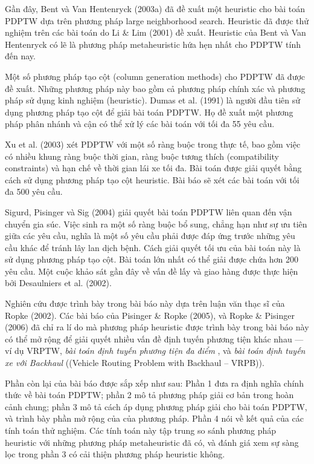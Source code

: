 Gần đây, Bent và Van Hentenryck (2003a) đã đề xuất một heuristic cho bài toán PDPTW dựa trên phương pháp large neighborhood search. Heuristic đã được thử nghiệm trên các bài toán do Li \& Lim (2001) đề xuất. Heuristic của Bent và Van Hentenryck có lẽ là phương pháp metaheuristic hứa hẹn nhất cho PDPTW tính đến nay.


Một số phương pháp tạo cột (column generation methods) cho PDPTW đã được đề xuất. Những phương pháp này bao gồm cả phương pháp chính xác và phương pháp sử dụng kinh nghiệm (heuristic). Dumas et al. (1991) là người đầu tiên sử dụng phương pháp tạo cột để giải bài toán PDPTW. Họ đề xuất một phương pháp phân nhánh và cận có thể xử lý các bài toán với tối đa 55 yêu cầu.

Xu et al. (2003) xét PDPTW với một số ràng buộc trong thực tế, bao gồm việc có nhiều khung ràng buộc thời gian, ràng buộc tương thích (compatibility constraints) và hạn chế về thời gian lái xe tối đa. Bài toán được giải quyết bằng cách sử dụng phương pháp tạo cột heuristic. Bài báo sẽ xét các bài toán với tối đa 500 yêu cầu.

Sigurd, Pisinger và Sig (2004) giải quyết bài toán PDPTW liên quan đến vận chuyển gia súc. Việc sinh ra một số ràng buộc bổ sung, chẳng hạn như sự ưu tiên giữa các yêu cầu, nghĩa là một số yêu cầu phải được đáp ứng trước những yêu cầu khác để tránh lây lan dịch bệnh. Cách giải quyết tối ưu của bài toán này là sử dụng phương pháp tạo cột. Bài toán lớn nhất có thể giải được chứa hơn 200 yêu cầu. Một cuộc khảo sát gần đây về vấn đề lấy và giao hàng được thực hiện bởi Desaulniers et al. (2002).

Nghiên cứu được trình bày trong bài báo này dựa trên luận văn thạc sĩ của Ropke (2002). Các bài báo của Pisinger \& Ropke (2005), và Ropke \& Pisinger (2006) đã chỉ ra lí do mà phương pháp heuristic được trình bày trong bài báo này có thể mở rộng để giải quyết nhiều vấn đề định tuyến phương tiện khác nhau — ví dụ VRPTW, \textit{bài toán định tuyến phương tiện đa điểm} , và \textit{bài toán định tuyến xe với Backhaul} ((Vehicle Routing Problem with Backhaul – VRPB)).

Phần còn lại của bài báo được sắp xếp như sau: Phần 1 đưa ra định nghĩa chính thức về bài toán PDPTW; phần 2 mô tả phương pháp giải cơ bản trong hoàn cảnh chung; phần 3 mô tả cách áp dụng phương pháp giải cho bài toán PDPTW, và trình bày phần mở rộng của của phương pháp. Phần 4 nói về kết quả của các tính toán thử nghiệm. Các tính toán này tập trung so sánh phương pháp heuristic với những phương pháp metaheuristic đã có, và đánh giá xem sự sàng lọc trong phần 3 có cải thiện phương pháp heuristic không.
